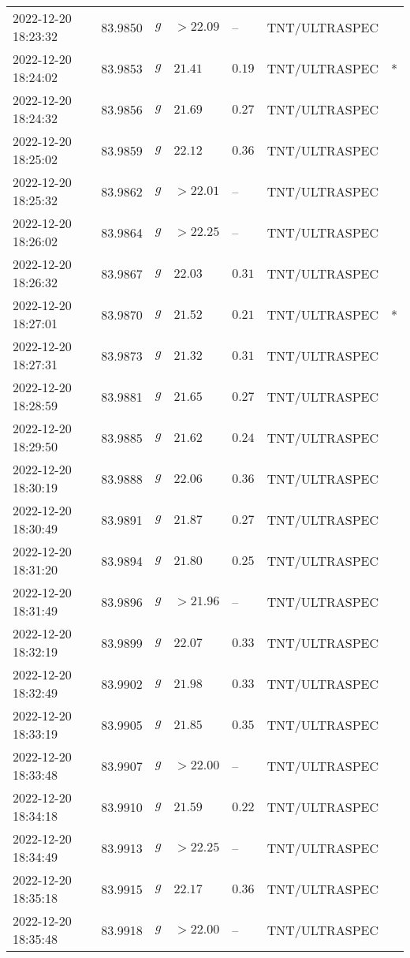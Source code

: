 \documentclass{nature_plusfigure}
\begin{document}
\begin{supplement}
\begin{center}
\begin{longtable}{lllllll}
2022-12-20 18:23:32 & 83.9850 & $g$ & $>22.09$ & -- & TNT/ULTRASPEC &  \\ 
2022-12-20 18:24:02 & 83.9853 & $g$ & $21.41$ & $0.19$ & TNT/ULTRASPEC & * \\ 
2022-12-20 18:24:32 & 83.9856 & $g$ & $21.69$ & $0.27$ & TNT/ULTRASPEC &  \\ 
2022-12-20 18:25:02 & 83.9859 & $g$ & $22.12$ & $0.36$ & TNT/ULTRASPEC &  \\ 
2022-12-20 18:25:32 & 83.9862 & $g$ & $>22.01$ & -- & TNT/ULTRASPEC &  \\ 
2022-12-20 18:26:02 & 83.9864 & $g$ & $>22.25$ & -- & TNT/ULTRASPEC &  \\ 
2022-12-20 18:26:32 & 83.9867 & $g$ & $22.03$ & $0.31$ & TNT/ULTRASPEC &  \\ 
2022-12-20 18:27:01 & 83.9870 & $g$ & $21.52$ & $0.21$ & TNT/ULTRASPEC & * \\ 
2022-12-20 18:27:31 & 83.9873 & $g$ & $21.32$ & $0.31$ & TNT/ULTRASPEC &  \\ 
2022-12-20 18:28:59 & 83.9881 & $g$ & $21.65$ & $0.27$ & TNT/ULTRASPEC &  \\ 
2022-12-20 18:29:50 & 83.9885 & $g$ & $21.62$ & $0.24$ & TNT/ULTRASPEC &  \\ 
2022-12-20 18:30:19 & 83.9888 & $g$ & $22.06$ & $0.36$ & TNT/ULTRASPEC &  \\ 
2022-12-20 18:30:49 & 83.9891 & $g$ & $21.87$ & $0.27$ & TNT/ULTRASPEC &  \\ 
2022-12-20 18:31:20 & 83.9894 & $g$ & $21.80$ & $0.25$ & TNT/ULTRASPEC &  \\ 
2022-12-20 18:31:49 & 83.9896 & $g$ & $>21.96$ & -- & TNT/ULTRASPEC &  \\ 
2022-12-20 18:32:19 & 83.9899 & $g$ & $22.07$ & $0.33$ & TNT/ULTRASPEC &  \\ 
2022-12-20 18:32:49 & 83.9902 & $g$ & $21.98$ & $0.33$ & TNT/ULTRASPEC &  \\ 
2022-12-20 18:33:19 & 83.9905 & $g$ & $21.85$ & $0.35$ & TNT/ULTRASPEC &  \\ 
2022-12-20 18:33:48 & 83.9907 & $g$ & $>22.00$ & -- & TNT/ULTRASPEC &  \\ 
2022-12-20 18:34:18 & 83.9910 & $g$ & $21.59$ & $0.22$ & TNT/ULTRASPEC &  \\ 
2022-12-20 18:34:49 & 83.9913 & $g$ & $>22.25$ & -- & TNT/ULTRASPEC &  \\ 
2022-12-20 18:35:18 & 83.9915 & $g$ & $22.17$ & $0.36$ & TNT/ULTRASPEC &  \\ 
2022-12-20 18:35:48 & 83.9918 & $g$ & $>22.00$ & -- & TNT/ULTRASPEC &  \\ 

\end{longtable}
\end{center}
\end{supplement}
\end{document}
